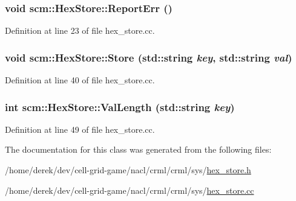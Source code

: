 \hypertarget{classscm_1_1_hex_store_ac98d4c0f37c642e6b45262ec1db62d80}{
\subsubsection[{ReportErr}]{\setlength{\rightskip}{0pt plus 5cm}void scm::HexStore::ReportErr ()}}
\label{classscm_1_1_hex_store_ac98d4c0f37c642e6b45262ec1db62d80}


Definition at line 23 of file hex\_\-store.cc.

\hypertarget{classscm_1_1_hex_store_aa1792118dbb32383976d6906c69c9e71}{
\subsubsection[{Store}]{\setlength{\rightskip}{0pt plus 5cm}void scm::HexStore::Store (std::string {\em key}, \/  std::string {\em val})}}
\label{classscm_1_1_hex_store_aa1792118dbb32383976d6906c69c9e71}


Definition at line 40 of file hex\_\-store.cc.

\hypertarget{classscm_1_1_hex_store_a277a7c2220511ad3c0e447802589def1}{
\subsubsection[{ValLength}]{\setlength{\rightskip}{0pt plus 5cm}int scm::HexStore::ValLength (std::string {\em key})}}
\label{classscm_1_1_hex_store_a277a7c2220511ad3c0e447802589def1}


Definition at line 49 of file hex\_\-store.cc.



The documentation for this class was generated from the following files:\begin{DoxyCompactItemize}
\item 
/home/derek/dev/cell-\/grid-\/game/nacl/crml/crml/sys/\hyperlink{hex__store_8h}{hex\_\-store.h}\item 
/home/derek/dev/cell-\/grid-\/game/nacl/crml/crml/sys/\hyperlink{hex__store_8cc}{hex\_\-store.cc}\end{DoxyCompactItemize}
